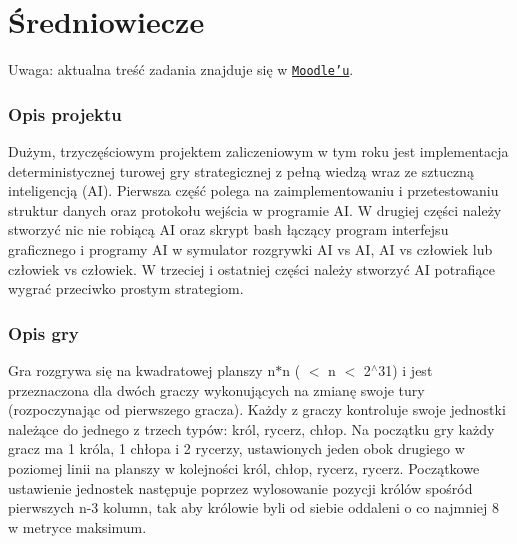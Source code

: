 \section*{Średniowiecze}

Uwaga\-: aktualna treść zadania znajduje się w \href{https://moodle.mimuw.edu.pl/mod/assignment/view.php?id=18178}{\tt Moodle'u}.

\subsubsection*{Opis projektu}

Dużym, trzyczęściowym projektem zaliczeniowym w tym roku jest implementacja deterministycznej turowej gry strategicznej z pełną wiedzą wraz ze sztuczną inteligencją (A\-I). Pierwsza część polega na zaimplementowaniu i przetestowaniu struktur danych oraz protokołu wejścia w programie A\-I. W drugiej części należy stworzyć nic nie robiącą A\-I oraz skrypt bash łączący program interfejsu graficznego i programy A\-I w symulator rozgrywki A\-I vs A\-I, A\-I vs człowiek lub człowiek vs człowiek. W trzeciej i ostatniej części należy stworzyć A\-I potrafiące wygrać przeciwko prostym strategiom.

\subsubsection*{Opis gry}

Gra rozgrywa się na kwadratowej planszy {\ttfamily n$\ast$n} ({ $<$ n $<$ 2$^\wedge$31}) i jest przeznaczona dla dwóch graczy wykonujących na zmianę swoje tury (rozpoczynając od pierwszego gracza). Każdy z graczy kontroluje swoje jednostki należące do jednego z trzech typów\-: król, rycerz, chłop. Na początku gry każdy gracz ma 1 króla, 1 chłopa i 2 rycerzy, ustawionych jeden obok drugiego w poziomej linii na planszy w kolejności król, chłop, rycerz, rycerz. Początkowe ustawienie jednostek następuje poprzez wylosowanie pozycji królów spośród pierwszych {\ttfamily n-\/3} kolumn, tak aby królowie byli od siebie oddaleni o co najmniej 8 w metryce maksimum.

